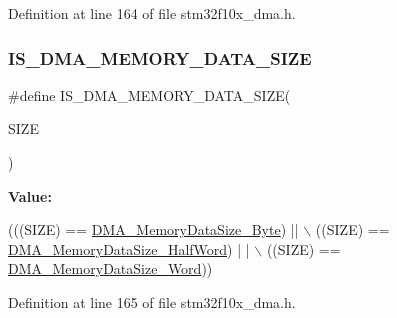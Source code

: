 Definition at line 164 of file stm32f10x\+\_\+dma.\+h.

\mbox{\label{group___d_m_a__memory__data__size_gac9e3748cebcb16d4ae4206d562bc804c}} 
\subsubsection{\texorpdfstring{I\+S\+\_\+\+D\+M\+A\+\_\+\+M\+E\+M\+O\+R\+Y\+\_\+\+D\+A\+T\+A\+\_\+\+S\+I\+ZE}{IS\_DMA\_MEMORY\_DATA\_SIZE}}
{\footnotesize\ttfamily \#define I\+S\+\_\+\+D\+M\+A\+\_\+\+M\+E\+M\+O\+R\+Y\+\_\+\+D\+A\+T\+A\+\_\+\+S\+I\+ZE(\begin{DoxyParamCaption}\item[{}]{S\+I\+ZE }\end{DoxyParamCaption})}

{\bfseries Value\+:}
\begin{DoxyCode}
(((SIZE) == \hyperlink{group___d_m_a__memory__data__size_gad6093bccb60ff9adf81e21c73c58ba17}{DMA\_MemoryDataSize\_Byte}) || \(\backslash\)
                                       ((SIZE) == \hyperlink{group___d_m_a__memory__data__size_ga74c9b4e547f5eaaf35d4fd3d01ed5741}{DMA\_MemoryDataSize\_HalfWord}) |
      | \(\backslash\)
                                       ((SIZE) == \hyperlink{group___d_m_a__memory__data__size_gaff403722a6f82d4b34c9ef306507bb98}{DMA\_MemoryDataSize\_Word}))
\end{DoxyCode}


Definition at line 165 of file stm32f10x\+\_\+dma.\+h.

